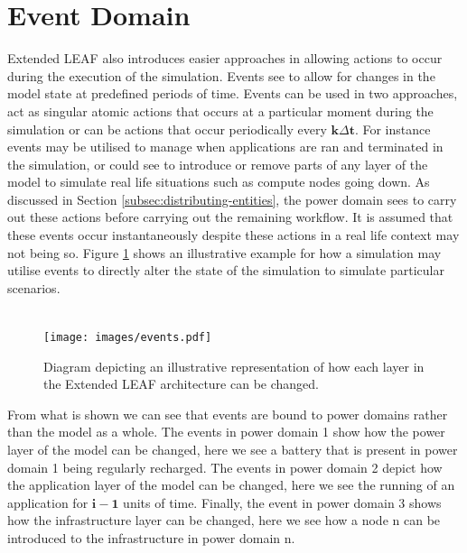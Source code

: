 \documentclass{l4proj}
\begin{document}
\section{Event Domain}\label{sec:events}
Extended LEAF also introduces easier approaches in allowing actions to occur during the execution of the simulation.
Events see to allow for changes in the model state at predefined periods of time.
Events can be used in two approaches, act as singular atomic actions that occurs at a particular moment during the simulation or can be actions that occur periodically every $\mathbf{k\varDelta t}$.
For instance events may be utilised to manage when applications are ran and terminated in the simulation, or could see to introduce or remove parts of any layer of the model to simulate real life situations such as compute nodes going down.
As discussed in Section \ref{subsec:distributing-entities}, the power domain sees to carry out these actions before carrying out the remaining workflow.
It is assumed that these events occur instantaneously despite these actions in a real life context may not being so.
Figure \ref{fig:events} shows an illustrative example for how a simulation may utilise events to directly alter the state of the simulation to simulate particular scenarios.\\ \\
\begin{figure}[h]
    \centering
    \texttt{[image: images/events.pdf]}
    ~
    \caption{Diagram depicting an illustrative representation of how each layer in the Extended LEAF architecture can be changed.}
    \label{fig:events}
\end{figure}
From what is shown we can see that events are bound to power domains rather than the model as a whole.
The events in power domain 1 show how the power layer of the model can be changed, here we see a battery that is present in power domain 1 being regularly recharged.
The events in power domain 2 depict how the application layer of the model can be changed, here we see the running of an application for $\mathbf{i - 1}$ units of time.
Finally, the event in power domain 3 shows how the infrastructure layer can be changed, here we see how a node n can be introduced to the infrastructure in power domain n.
\end{document}
